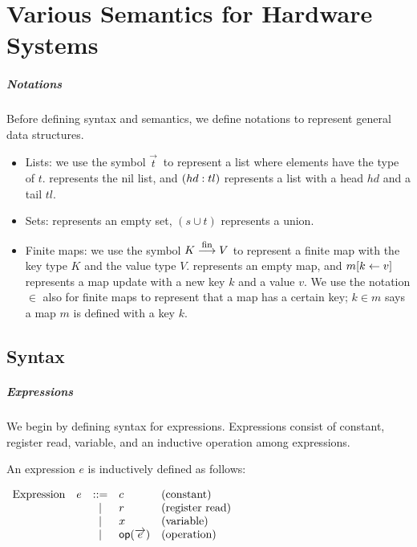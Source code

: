 \chapter{Various Semantics for Hardware Systems}
\label{chap-semantics}

\paragraph{Notations}

Before defining syntax and semantics, we define notations to represent
general data structures.
\begin{itemize}
\item Lists: we use the symbol $\vec{t}\ $ to represent a list where
  elements have the type of $t$. \listnil{} represents the nil list,
  and $(hd:tl)$ represents a list with a head $hd$ and a
  tail $tl$.
\item Sets: \emptyset{} represents an empty set, $(s \cup t)$
  represents a union.
\item Finite maps: we use the symbol $K \stackrel{\textrm{\footnotesize{fin}}}{\longrightarrow} V$ to represent a
  finite map with the key type $K$ and the value type $V$. \emptymap{}
  represents an empty map, and $m [ k \leftarrow v ]$ represents a map
  update with a new key $k$ and a value $v$. We use the notation $\in$
  also for finite maps to represent that a map has a certain key; $k
  \in m$ says a map $m$ is defined with a key $k$.
\end{itemize}

\section{Syntax}

\paragraph{Expressions}
We begin by defining syntax for expressions. Expressions
consist of constant, register read, variable, and an inductive
operation among expressions.

\begin{definition}
  \label{def-expression}
  An expression $e$ is inductively defined as follows:
  \begin{center}
    \begin{math}
      \begin{array}{rcll}
        \textrm{Expression}\quad e & ::= & c & \textrm{(constant)} \\
        & | & r & \textrm{(register read)} \\
        & | & x & \textrm{(variable)} \\
        & | & \textsf{op}{}(\overrightarrow{e}) & \textrm{(operation)} \\
      \end{array}
    \end{math}
  \end{center}
\end{definition}

